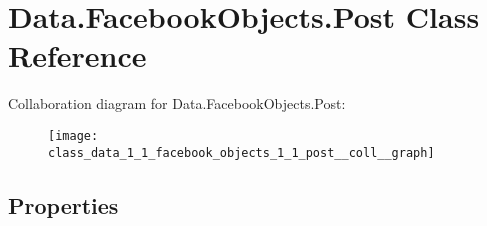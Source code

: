 \hypertarget{class_data_1_1_facebook_objects_1_1_post}{}\section{Data.\+Facebook\+Objects.\+Post Class Reference}
\label{class_data_1_1_facebook_objects_1_1_post}


Collaboration diagram for Data.\+Facebook\+Objects.\+Post\+:
\nopagebreak
\begin{figure}[H]
\begin{center}
\leavevmode
\texttt{[image: class\_data\_1\_1\_facebook\_objects\_1\_1\_post\_\_coll\_\_graph]}
\end{center}
\end{figure}
\subsection*{Properties}
